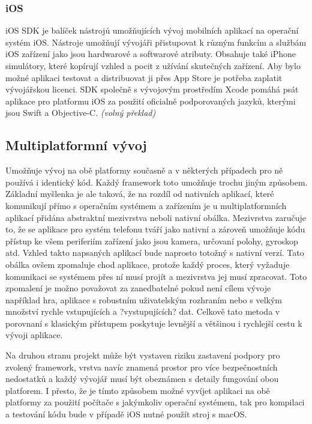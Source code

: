 \documentclass[
  biblatex,
  glossaries,
  index
]{kidiplom}
\begin{document}
\subsubsection{iOS}
iOS SDK je balíček nástrojů umožňujících vývoj mobilních aplikací na operační systém iOS. Nástroje umožňují vývojáři přistupovat k různým funkcím a službám iOS zařízení jako jsou hardwarové a softwarové atributy. Obsahuje také iPhone simulátory, které kopírují vzhled a pocit z užívání skutečných zařízení. Aby bylo možné aplikaci testovat a distribuovat ji přes App Store je potřeba zaplatit vývojářskou licenci. SDK společně s vývojovým prostředím Xcode pomáhá psát aplikace pro platformu iOS za použití oficialně podporovaných  jazyků, kterými jsou Swift a Objective-C. 
\cite{2}
\textit{(volný překlad)}

\subsection{Multiplatformní vývoj}
Umožňuje vývoj na obě platformy současně a v některých případech pro ně používá i identický kód. Každý framework toto umožňuje trochu jiným způsobem. Základní myšlenka je ale taková, že na rozdíl od nativních aplikací, které komunikují přímo s operačním systémem a zařízením je u multiplatformních aplikací přidána abstraktní mezivrstva neboli nativní obálka. Mezivrstva zaručuje to, že se aplikace pro systém telefonu tváří jako nativní a zároveň umožňuje kódu přístup ke všem periferiím zařízení jako jsou kamera, určovaní polohy, gyroskop atd. Vzhled takto napsaných aplikací bude naprosto totožný s nativní verzí. Tato obálka ovšem zpomaluje chod aplikace, protože každý proces, který vyžaduje komunikaci se systémem přes ní musí projít a mezivrstva jej musí zpracovat. Toto zpomalení je možno považovat za zanedbatelné pokud není cílem vývoje například hra, aplikace s robustním uživatelským rozhraním nebo s velkým množství rychle vstupujících a ?vystupujících? dat. Celkově tato metoda v porovnaní s klasickým přístupem poskytuje levnější a většinou i rychlejší cestu k vývoji aplikace. 

Na druhou stranu projekt může být vystaven riziku zastavení podpory pro zvolený framework, vrstva navíc znamená prostor pro více bezpečnostních nedostatků a každý vývojář musí být obeznámen s detaily fungování obou platforem. I přesto, že je tímto způsobem možné vyvíjet aplikaci na obě platformy za použití počítače s jakýmkoliv operační systémem, tak pro kompilaci a testování kódu bude v případě iOS nutné použít stroj s macOS. 
\end{document}
